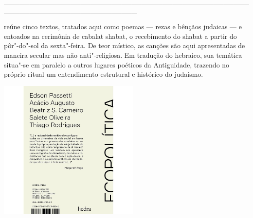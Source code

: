 \hspace*{-2cm}\_\_\_\_\_\_\_\_\_\_\_\_\_\_\_\_\_\_\_\_\_\_\_\_\_\_\_\_\_\_\_\_\_\_\_\_\_\_\_\_\_\_\_\_\_\_\_\_\_\_\_\_\_\_\_\_\_\_\_\_\_\_\_\_\_\_\_\_\_\_\_\_\_\_

\medskip

 reúne cinco textos, tratados aqui como poemas --- rezas e bênçãos judaicas --- e entoados na cerimônia de cabalat shabat, o recebimento do shabat a partir do pôr"-do"-sol da sexta"-feira. De teor místico, as canções são aqui apresentadas de maneira secular mas não anti"-religiosa. Em tradução do hebraico, sua temática situa"-se em paralelo a outros lugares poéticos da Antiguidade, trazendo no próprio ritual um entendimento estrutural e histórico do judaísmo. %

\vfill

\hspace*{-.4cm}\begin{minipage}[c]{0.60\linewidth}
\small{
{}}
\end{minipage}


\pagebreak

\hspace{.5cm}

\begin{center}
\hspace*{-1cm}
\hspace*{1cm}\includegraphics[width=70mm]{eco.jpeg}
\end{center}

